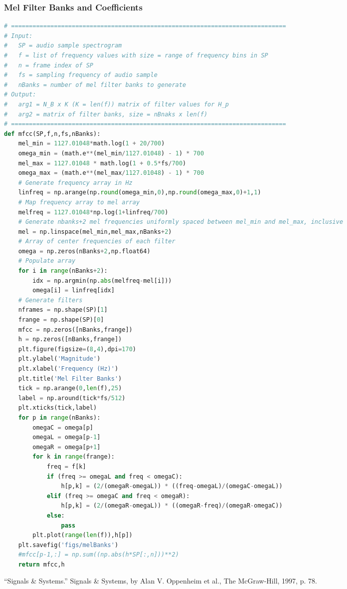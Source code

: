 \documentclass[11pt,a4paper]{article}
\begin{document}
	\subsubsection{Mel Filter Banks and Coefficients} \label{app:mfcc}
		\begin{lstlisting}[language=Python,label={lst:mfcc}]
# =============================================================================
# Input:
#   SP = audio sample spectrogram
#   f = list of frequency values with size = range of frequency bins in SP
#   n = frame index of SP
#   fs = sampling frequency of audio sample
#   nBanks = number of mel filter banks to generate
# Output:
#   arg1 = N_B x K (K = len(f)) matrix of filter values for H_p
#   arg2 = matrix of filter banks, size = nBnaks x len(f)
# =============================================================================
def mfcc(SP,f,n,fs,nBanks):
    mel_min = 1127.01048*math.log(1 + 20/700)
    omega_min = (math.e**(mel_min/1127.01048) - 1) * 700
    mel_max = 1127.01048 * math.log(1 + 0.5*fs/700)
    omega_max = (math.e**(mel_max/1127.01048) - 1) * 700
    # Generate frequency array in Hz
    linfreq = np.arange(np.round(omega_min,0),np.round(omega_max,0)+1,1)
    # Map frequency array to mel array
    melfreq = 1127.01048*np.log(1+linfreq/700)
    # Generate nbanks+2 mel frequencies uniformly spaced between mel_min and mel_max, inclusive
    mel = np.linspace(mel_min,mel_max,nBanks+2)
    # Array of center frequencies of each filter
    omega = np.zeros(nBanks+2,np.float64)
    # Populate array
    for i in range(nBanks+2):
        idx = np.argmin(np.abs(melfreq-mel[i]))
        omega[i] = linfreq[idx]
    # Generate filters
    nframes = np.shape(SP)[1]
    frange = np.shape(SP)[0]
    mfcc = np.zeros([nBanks,frange])
    h = np.zeros([nBanks,frange])
    plt.figure(figsize=(8,4),dpi=170)
    plt.ylabel('Magnitude')
    plt.xlabel('Frequency (Hz)')
    plt.title('Mel Filter Banks')
    tick = np.arange(0,len(f),25)
    label = np.around(tick*fs/512)
    plt.xticks(tick,label)
    for p in range(nBanks):
        omegaC = omega[p]
        omegaL = omega[p-1]
        omegaR = omega[p+1]
        for k in range(frange):
            freq = f[k]
            if (freq >= omegaL and freq < omegaC):
                h[p,k] = (2/(omegaR-omegaL)) * ((freq-omegaL)/(omegaC-omegaL))
            elif (freq >= omegaC and freq < omegaR):
                h[p,k] = (2/(omegaR-omegaL)) * ((omegaR-freq)/(omegaR-omegaC))
            else:
                pass
        plt.plot(range(len(f)),h[p])
    plt.savefig('figs/melBanks')
    #mfcc[p-1,:] = np.sum((np.abs(h*SP[:,n]))**2)
    return mfcc,h
		\end{lstlisting}
		
\pagebreak

\begin{thebibliography}{1}
“Signals \& Systems.” Signals \& Systems, by Alan V. Oppenheim et al., The McGraw-Hill, 1997, p. 78.

\end{thebibliography}
\end{document}
